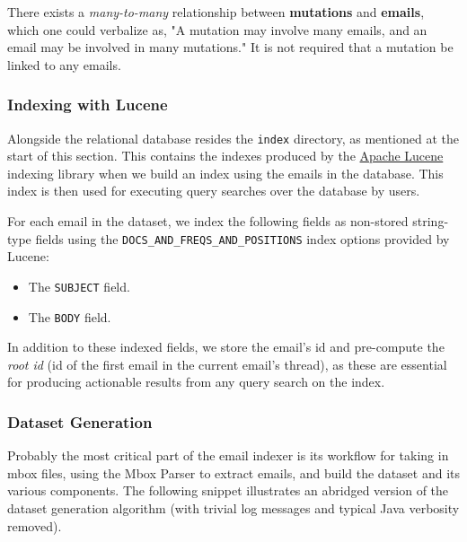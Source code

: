 \documentclass[a4paper, 12pt]{article}
\begin{document}
			There exists a \textit{many-to-many} relationship between \textbf{mutations} and \textbf{emails}, which one could verbalize as, "A mutation may involve many emails, and an email may be involved in many mutations." It is not required that a mutation be linked to any emails.
		
		\subsubsection{Indexing with Lucene}
			Alongside the relational database resides the \texttt{index} directory, as mentioned at the start of this section. This contains the indexes produced by the \href{https://lucene.apache.org/}{Apache Lucene} indexing library when we build an index using the emails in the database. This index is then used for executing query searches over the database by users.
			
			For each email in the dataset, we index the following fields as non-stored string-type fields using the \texttt{DOCS\_AND\_FREQS\_AND\_POSITIONS} index options provided by Lucene\cite{apache-lucene}:
			\begin{itemize}
				\item The \texttt{SUBJECT} field.
				\item The \texttt{BODY} field.
			\end{itemize}
			In addition to these indexed fields, we store the email's id and pre-compute the \textit{root id} (id of the first email in the current email's thread), as these are essential for producing actionable results from any query search on the index.
	
		\newpage %
		\subsubsection{Dataset Generation}
			Probably the most critical part of the email indexer is its workflow for taking in mbox files, using the Mbox Parser to extract emails, and build the dataset and its various components. The following snippet illustrates an abridged version of the dataset generation algorithm (with trivial log messages and typical Java verbosity removed).
			
\end{document}
